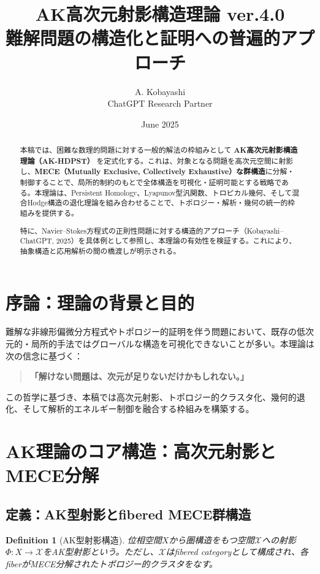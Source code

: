 \documentclass[11pt]{article}
\title{AK高次元射影構造理論 ver.4.0\\ \large 難解問題の構造化と証明への普遍的アプローチ}
\author{A. Kobayashi \\ ChatGPT Research Partner}
\date{June 2025}
\newtheorem{definition}[theorem]{Definition}
\begin{document}
\maketitle

\begin{abstract}
本稿では、困難な数理的問題に対する一般的解法の枠組みとして \textbf{AK高次元射影構造理論（AK-HDPST）} を定式化する。これは、対象となる問題を高次元空間に射影し、\textbf{MECE（Mutually Exclusive, Collectively Exhaustive）な群構造}に分解・制御することで、局所的制約のもとで全体構造を可視化・証明可能とする戦略である。本理論は、Persistent Homology、Lyapunov型汎関数、トロピカル幾何、そして混合Hodge構造の退化理論を組み合わせることで、トポロジー・解析・幾何の統一的枠組みを提供する。

特に、Navier--Stokes方程式の正則性問題に対する構造的アプローチ（Kobayashi--ChatGPT, 2025）を具体例として参照し、本理論の有効性を検証する。これにより、抽象構造と応用解析の間の橋渡しが明示される。
\end{abstract}

\tableofcontents

\section{序論：理論の背景と目的}
難解な非線形偏微分方程式やトポロジー的証明を伴う問題において、既存の低次元的・局所的手法ではグローバルな構造を可視化できないことが多い。本理論は次の信念に基づく：
\begin{quote}
\textbf{「解けない問題は、次元が足りないだけかもしれない。」}
\end{quote}
この哲学に基づき、本稿では高次元射影、トポロジー的クラスタ化、幾何的退化、そして解析的エネルギー制御を融合する枠組みを構築する。

\section{AK理論のコア構造：高次元射影とMECE分解}
\subsection{定義：AK型射影とfibered MECE群構造}
\begin{definition}[AK型射影構造]
位相空間\(X\)から圏構造をもつ空間\(\mathcal{X}\)への射影\(\Phi: X \to \mathcal{X}\)をAK型射影という。ただし、\(\mathcal{X}\)はfibered categoryとして構成され、各fiberがMECE分解されたトポロジー的クラスタをなす。
\end{definition}
\end{document}
